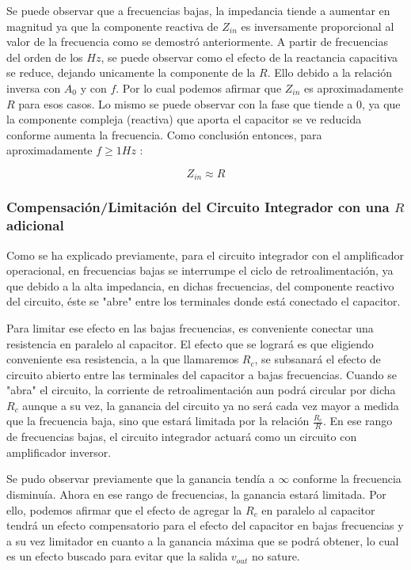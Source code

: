 Se puede observar que a frecuencias bajas, la impedancia tiende a aumentar en magnitud ya que la componente reactiva de 
$Z_{in}$ es inversamente proporcional al valor de la frecuencia como se demostró anteriormente.
A partir de frecuencias del orden de los $Hz$, se puede observar como el efecto de la reactancia capacitiva 
se reduce, dejando unicamente la componente de la $R$. Ello debido a la relación inversa con $A_0$ y con $f$.
Por lo cual podemos afirmar que $Z_{in}$ es aproximadamente $R$ para esos casos.
Lo mismo se puede observar con la fase que tiende a 0, ya que la componente compleja (reactiva) que aporta el capacitor se ve reducida conforme aumenta la frecuencia.
Como conclusión entonces, para aproximadamente $f \geq 1Hz$ :

$$Z_{in} \approx R$$

\subsubsection{Compensación/Limitación del Circuito Integrador con una $R$ adicional}

Como se ha explicado previamente, para el circuito integrador con el amplificador operacional, en frecuencias bajas se interrumpe el ciclo de retroalimentación,
ya que debido a la alta impedancia, en dichas frecuencias, del componente reactivo del circuito, éste se "abre" entre los terminales donde está conectado el capacitor.

Para limitar ese efecto en las bajas frecuencias, es conveniente conectar una resistencia en paralelo al capacitor. El efecto que se logrará es que eligiendo conveniente esa resistencia,
a la que llamaremos $R_c$, se subsanará el efecto de circuito abierto entre las terminales del capacitor a bajas frecuencias. Cuando se "abra" el circuito, la corriente de retroalimentación
aun podrá circular por dicha $R_c$ aunque a su vez, la ganancia del circuito ya no será cada vez mayor a medida que la frecuencia baja, sino que estará limitada por la relación 
$\frac{R_c}{R}$. En ese rango de frecuencias bajas, el circuito integrador actuará como un circuito con amplificador inversor. 

Se pudo observar previamente que la ganancia tendía a $\infty$ conforme la frecuencia disminuía. Ahora en ese rango de frecuencias, la ganancia estará limitada. Por ello, podemos
afirmar que el efecto de agregar la $R_c$ en paralelo al capacitor tendrá un efecto compensatorio para el efecto del capacitor en bajas frecuencias y a su vez limitador en cuanto a la 
ganancia máxima que se podrá obtener, lo cual es un efecto buscado para evitar que la salida $v_{out}$ no sature.

